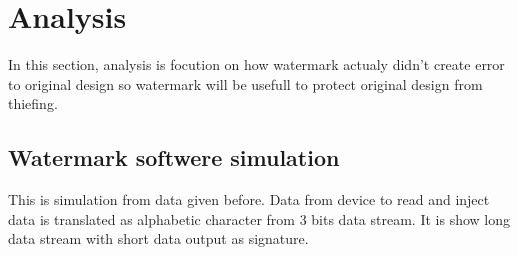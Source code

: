 \documentclass[10pt,journal,compsoc]{IEEEtran}
\begin{document}
\section{Analysis}
In this section, analysis is focution on how watermark actualy didn't create error to original design
so watermark will be usefull to protect original design from thiefing.


\subsection{Watermark softwere simulation}
This is simulation from data given before. Data from device to read and inject data is translated as alphabetic character from 3 bits data stream. It is show long data stream with short data output as signature.
\end{document}
